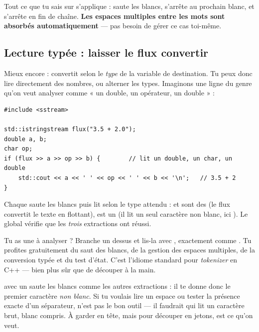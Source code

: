 \documentclass[11pt]{article}
\begin{document}
Tout ce que tu sais sur  s'applique : \code{>>} saute les blancs,
s'arrête au prochain blanc, et  s'arrête en fin de
chaîne. \textbf{Les espaces multiples entre les mots sont absorbés
automatiquement} — pas besoin de gérer ce cas toi-même.

\subsection*{Lecture typée : laisser le flux convertir}

Mieux encore : \code{>>} convertit selon le \emph{type} de la variable de
destination. Tu peux donc lire directement des nombres, ou alterner les types.
Imaginons une ligne du genre  qu'on veut analyser comme « un
double, un opérateur, un double » :

\begin{lstlisting}
#include <sstream>

std::istringstream flux("3.5 + 2.0");
double a, b;
char op;
if (flux >> a >> op >> b) {        // lit un double, un char, un double
    std::cout << a << ' ' << op << ' ' << b << '\n';   // 3.5 + 2
}
\end{lstlisting}

Chaque \code{>>} saute les blancs puis lit selon le type attendu :  et
 sont des  (le flux convertit le texte en flottant),
 est un  (il lit un seul caractère non blanc, ici ).
Le  global vérifie que les \emph{trois} extractions ont réussi.

\begin{aretenir}
Tu as une  à analyser ? Branche un 
dessus et lis-la avec \code{>>}, exactement comme . Tu profites
gratuitement du saut des blancs, de la gestion des espaces multiples, de la
conversion typée et du test d'état. C'est l'idiome standard pour
\emph{tokenizer} en C++ — bien plus sûr que de découper à la main.
\end{aretenir}

\begin{piege}
 avec  un  saute les blancs comme les autres
extractions : il te donne donc le premier caractère \emph{non blanc}. Si tu
voulais lire un espace ou tester la présence exacte d'un séparateur, \code{>>}
n'est pas le bon outil — il faudrait  qui lit un caractère brut,
blanc compris. À garder en tête, mais pour découper en jetons, \code{>>} est ce
qu'on veut.
\end{piege}
\end{document}
